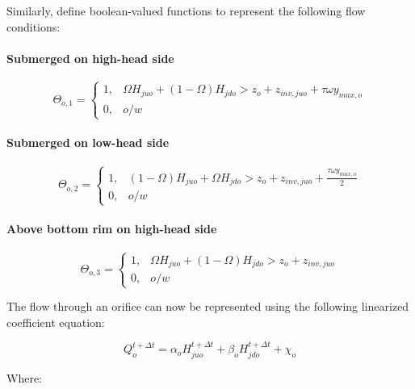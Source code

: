 \documentclass[11pt]{article}
\begin{document}
Similarly, define boolean-valued functions to represent the
following flow conditions:

\paragraph{Submerged on high-head side}

\begin{equation}
  \Theta_{o,1} =
  \begin{cases}
    1, &   \Omega H_{juo} + (1 - \Omega) H_{jdo} > z_o + z_{inv,juo} + \tau \omega y_{max,o} \\
    0, & o/w
  \end{cases}
\end{equation}

\paragraph{Submerged on low-head side}

\begin{equation}
  \Theta_{o,2} =
  \begin{cases}
    1, & (1 - \Omega) H_{juo} + \Omega H_{jdo} > z_o + z_{inv,juo} + \frac{\tau \omega y_{max,o}}{2} \\
    0, & o/w
  \end{cases}
\end{equation}

\paragraph{Above bottom rim on high-head side}

\begin{equation}
  \Theta_{o,3} = 
  \begin{cases}
    1, & \Omega H_{juo} + (1 - \Omega) H_{jdo} > z_o + z_{inv,juo} \\
    0, & o/w
  \end{cases}
\end{equation}

The flow through an orifice can now be represented using the following
linearized coefficient equation:

\begin{equation}
  \boxed{
 Q_{o}^{t + \Delta t} = \alpha_{o} H_{juo}^{t + \Delta t} + \beta_{o} H_{jdo}^{t + \Delta t} + \chi_{o} 
 }
\end{equation}

Where:

\end{document}
